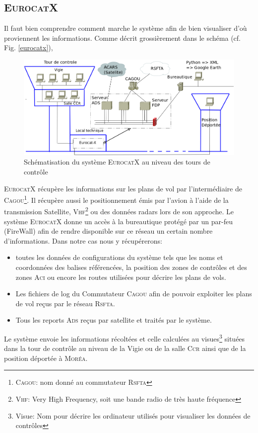     \subsection{\textsc{EurocatX}}
Il faut bien comprendre comment marche le système afin de bien visualiser d'où proviennent les informations. Comme décrit grossièrement dans le schéma (cf. Fig. \vref{eurocatx}),
\begin{figure}[!h]
    \center
    \includegraphics[width=15cm]{images/SchemaControle.png}
    \caption{Schématisation du système \textsc{EurocatX} au niveau des tours de contrôle}
    \label{eurocatx}
\end{figure}
\textsc{EurocatX} récupère les informations sur les plans de vol par l'intermédiaire de \textsc{Cagou}\footnote{\textsc{Cagou}: nom donné au commutateur \textsc{Rsfta}}. Il récupère aussi le positionnement émis par l'avion à l'aide de la transmission Satellite, \textsc{Vhf}\footnote{\textsc{Vhf}: Very High Frequency, soit une bande radio de très haute fréquence} ou des données radars lors de son approche. Le système \textsc{EurocatX} donne un accès à la bureautique protégé par un par-feu (FireWall) afin de rendre disponible sur ce réseau un certain nombre d'informations. Dans notre cas nous y récupérerons:
\begin{itemize}
    \item toutes les données de configurations du système tels que les noms et coordonnées des balises référencées, la position des zones de contrôles et des zones \textsc{Aci} ou encore les routes utilisées pour décrire les plans de vols.
    \item Les fichiers de log du Commutateur \textsc{Cagou} afin de pouvoir exploiter les plans de vol reçus par le réseau \textsc{Rsfta}.
    \item Tous les reports \textsc{Ads} reçus par satellite et traités par le système.
\end{itemize}\medskip 
Le système envoie les informations récoltées et celle calculées au visues\footnote{Visue: Nom pour décrire les ordinateur utilisés pour visualiser les données de contrôles} situées dans la tour de contrôle au niveau de la Vigie ou de la salle \textsc{Ccr} ainsi que de la position déportée à \textsc{Moréa}.

